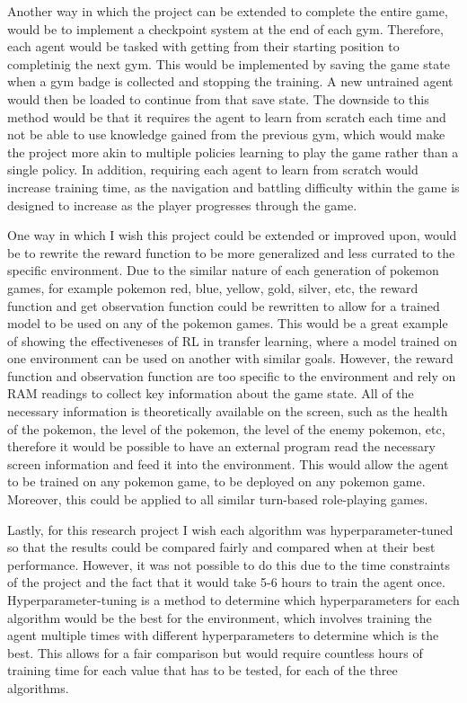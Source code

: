 Another way in which the project can be extended to complete the entire game, would be to implement a checkpoint system at the end of each gym. Therefore, each agent would be tasked with getting from their starting position to completinig the next gym. This would be implemented by saving the game state when a gym badge is collected and stopping the training. A new untrained agent would then be loaded to continue from that save state. The downside to this method would be that it requires the agent to learn from scratch each time and not be able to use knowledge gained from the previous gym, which would make the project more akin to multiple policies learning to play the game rather than a single policy. In addition, requiring each agent to learn from scratch would increase training time, as the navigation and battling difficulty within the game is designed to increase as the player progresses through the game.

One way in which I wish this project could be extended or improved upon, would be to rewrite the reward function to be more generalized and less currated to the specific environment. Due to the similar nature of each generation of pokemon games, for example pokemon red, blue, yellow, gold, silver, etc, the reward function and get observation function could be rewritten to allow for a trained model to be used on any of the pokemon games. This would be a great example of showing the effectiveneses of RL in transfer learning, where a model trained on one environment can be used on another with similar goals. However, the reward function and observation function are too specific to the environment and rely on RAM readings to collect key information about the game state. All of the necessary information is theoretically available on the screen, such as the health of the pokemon, the level of the pokemon, the level of the enemy pokemon, etc, therefore it would be possible to have an external program read the necessary screen information and feed it into the environment. This would allow the agent to be trained on any pokemon game, to be deployed on any pokemon game. Moreover, this could be applied to all similar turn-based role-playing games. 

Lastly, for this research project I wish each algorithm was hyperparameter-tuned so that the results could be compared fairly and compared when at their best performance. However, it was not possible to do this due to the time constraints of the project and the fact that it would take 5-6 hours to train the agent once. Hyperparameter-tuning is a method to determine which hyperparameters for each algorithm would be the best for the environment, which involves training the agent multiple times with different hyperparameters to determine which is the best. This allows for a fair comparison but would require countless hours of training time for each value that has to be tested, for each of the three algorithms. 